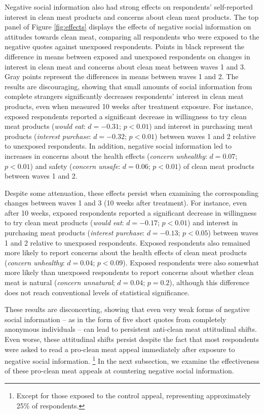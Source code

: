 \documentclass[12pt]{article}
\begin{document}
Negative social information also had strong effects on respondents' self-reported interest in clean meat products and concerns about clean meat products. The top panel of Figure \ref{fig:effects} displays the effects of negative social information on attitudes towards clean meat, comparing all respondents who were exposed to the negative quotes against unexposed respondents. Points in black represent the difference in means between exposed and unexposed respondents on changes in interest in clean meat and concerns about clean meat between waves 1 and 3. Gray points represent the differences in means between waves 1 and 2. The results are discouraging, showing that small amounts of social information from complete strangers significantly decreases respondents' interest in clean meat products, even when measured 10 weeks after treatment exposure. For instance, exposed respondents reported a significant decrease in willingness to try clean meat products (\textit{would eat}: $d=-0.31$; $p < 0.01$) and interest in purchasing meat products (\textit{interest purchase}: $d=-0.32$; $p < 0.01$) between waves 1 and 2 relative to unexposed respondents. In addition, negative social information led to increases in concerns about the health effects (\textit{concern unhealthy}: $d=0.07$; $p < 0.01$) and safety (\textit{concern unsafe}: $d=0.06$; $p < 0.01$) of clean meat products between waves 1 and 2.

Despite some attenuation, these effects persist when examining the corresponding changes between waves 1 and 3 (10 weeks after treatment). For instance, even after 10 weeks, exposed respondents reported a significant decrease in willingness to try clean meat products (\textit{would eat}: $d=-0.17$; $p < 0.01$) and interest in purchasing meat products (\textit{interest purchase}: $d=-0.13$; $p < 0.05$) between waves 1 and 2 relative to unexposed respondents. Exposed respondents also remained more likely to report concerns about the health effects of clean meat products (\textit{concern unhealthy}: $d=0.04$; $p < 0.09$). Exposed respondents were also somewhat more likely than unexposed respondents to report concerns about whether clean meat is natural (\textit{concern unnatural}; $d=0.04$; $p = 0.2$), although this difference does not reach conventional levels of statistical significance.

These results are disconcerting, showing that even very weak forms of negative social information -- as in the form of five short quotes from completely anonymous individuals -- can lead to persistent anti-clean meat attitudinal shifts. Even worse, these attitudinal shifts persist despite the fact that most respondents were asked to read a pro-clean meat appeal immediately after exposure to negative social information.
\footnote{Except for those exposed to the control appeal, representing approximately 25\% of respondents.}
In the next subsection, we examine the effectiveness of these pro-clean meat appeals at countering negative social information.
\end{document}
